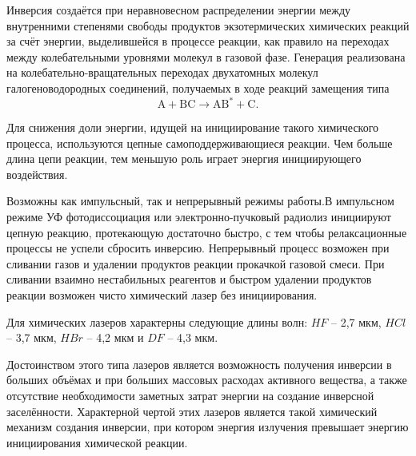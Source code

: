 Инверсия создаётся при неравновесном распределении энергии между внутренними 
степенями свободы продуктов экзотермических химических реакций за счёт 
энергии, выделившейся в процессе реакции, как правило на переходах между 
колебательными уровнями молекул в газовой фазе. Генерация реализована на 
колебательно-вращательных переходах двухатомных молекул галогеноводородных 
соединений, получаемых в ходе реакций замещения типа
\[
 	\mathrm{A + BC \rightarrow AB^* + C.}
\]

Для снижения доли энергии, идущей на инициирование такого химического 
процесса, используются цепные самоподдерживающиеся реакции. Чем больше длина 
цепи реакции, тем меньшую роль играет энергия инициирующего воздействия.

Возможны как импульсный, так и непрерывный режимы работы.В импульсном режиме 
УФ фотодиссоциация или электронно-пучковый радиолиз инициируют цепную реакцию, 
протекающую достаточно быстро, с тем чтобы релаксационные процессы не успели 
сбросить инверсию. Непрерывный процесс возможен при сливании газов и удалении 
продуктов реакции прокачкой газовой смеси. При сливании взаимно нестабильных 
реагентов и быстром удалении продуктов реакции возможен чисто химический лазер 
без инициирования.

Для химических лазеров характерны следующие длины волн: \( HF \) -- 2,7 мкм,
\( HCl \) -- 3,7 мкм, \( HBr \) -- 4,2 мкм и \( DF \) -- 4,3 мкм.

Достоинством этого типа лазеров является возможность получения инверсии в 
больших объёмах и при больших массовых расходах активного вещества, а также 
отсутствие необходимости заметных затрат энергии на создание инверсной 
заселённости. Характерной чертой этих лазеров является такой химический 
механизм создания инверсии, при котором энергия излучения превышает энергию 
инициирования химической реакции.
